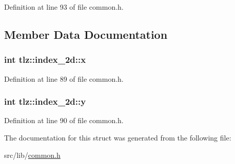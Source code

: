 Definition at line 93 of file common.\+h.



\subsection{Member Data Documentation}
\subsubsection[{\texorpdfstring{x}{x}}]{\setlength{\rightskip}{0pt plus 5cm}int tlz\+::index\+\_\+2d\+::x}\hypertarget{structtlz_1_1index__2d_a1035763bee547dacf5abf62030ba0294}{}\label{structtlz_1_1index__2d_a1035763bee547dacf5abf62030ba0294}


Definition at line 89 of file common.\+h.

\subsubsection[{\texorpdfstring{y}{y}}]{\setlength{\rightskip}{0pt plus 5cm}int tlz\+::index\+\_\+2d\+::y}\hypertarget{structtlz_1_1index__2d_a1e7f4d031e279cff0cc45fc09cd2d501}{}\label{structtlz_1_1index__2d_a1e7f4d031e279cff0cc45fc09cd2d501}


Definition at line 90 of file common.\+h.



The documentation for this struct was generated from the following file\+:\begin{DoxyCompactItemize}
\item 
src/lib/\hyperlink{lib_2common_8h}{common.\+h}\end{DoxyCompactItemize}
